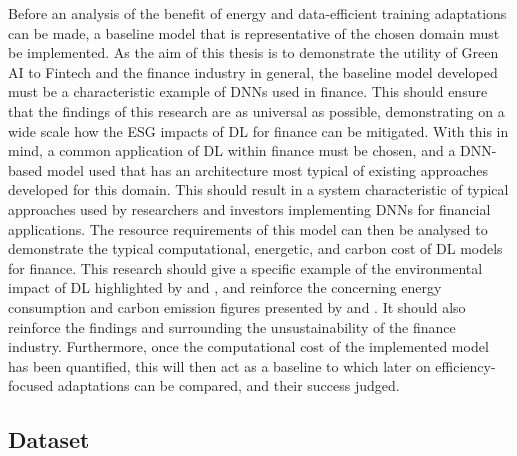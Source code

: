 \documentclass[a4paper, 11pt]{report}
\begin{document}
    Before an analysis of the benefit of energy and data-efficient training adaptations can be made, a baseline model that is representative of the chosen domain must be implemented. As the aim of this thesis is to demonstrate the utility of Green AI to Fintech and the finance industry in general, the baseline model developed must be a characteristic example of DNNs used in finance. This should ensure that the findings of this research are as universal as possible, demonstrating on a wide scale how the ESG impacts of DL for finance can be mitigated. With this in mind, a common application of DL within finance must be chosen, and a DNN-based model used that has an architecture most typical of existing approaches developed for this domain. This should result in a system characteristic of typical approaches used by researchers and investors implementing DNNs for financial applications. The resource requirements of this model can then be analysed to demonstrate the typical computational, energetic, and carbon cost of DL models for finance. This research should give a specific example of the environmental impact of DL highlighted by \citet{schwartz-2019} and \citet{strubell-2019}, and reinforce the concerning energy consumption and carbon emission figures presented by \citet{hockstad-2018} and \citet{masanet-2020}. It should also reinforce the findings \citet{greenpeace-2021} and \citet{power-2020} surrounding the unsustainability of the finance industry. Furthermore, once the computational cost of the implemented model has been quantified, this will then act as a baseline to which later on efficiency-focused adaptations can be compared, and their success judged.


    \subsection{Dataset}
\end{document}
